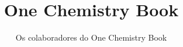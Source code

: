 \documentclass[11pt,a4paper,twoside,openany]{book}
\title{One Chemistry Book}
\author{Os colaboradores do One Chemistry Book}
\date{\bookdate}
\begin{document}
\frontmatter




\tableofcontents

\mainmatter



\appendix
\part{\omsolutionspart}


\backmatter
\renewcommand{\indexspace}{\par\vskip 8pt plus 4pt minus 4pt\relax}
\printindex
\end{document}
